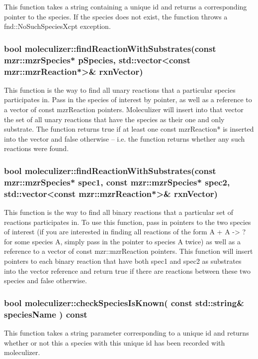 This function takes a string containing a unique id and returns a
corresponding pointer to the species.  If the species does not exist,
the function throws a fnd::NoSuchSpeciesXcpt exception.  

\subsubsection{bool
  moleculizer::findReactionWithSubstrates(const mzr::mzrSpecies*
  pSpecies, std::vector<const mzr::mzrReaction*>\& rxnVector) }

This function is the way to find all unary reactions that a particular
species participates in.  Pass in the species of interest by pointer,
as well as a reference to a vector of const mzrReaction pointers.
Moleculizer will insert into that vector the set of all unary
reactions that have the species as their one and only substrate.  The
function returns true if at least one const mzrReaction* is inserted
into the vector and false otherwise -- i.e. the function returns
whether any such reactions were found.  


\subsubsection{bool moleculizer::findReactionWithSubstrates(const
  mzr::mzrSpecies* spec1, const mzr::mzrSpecies* spec2,
  std::vector<const mzr::mzrReaction*>\& rxnVector)}

This function is the way to find all binary reactions that a
particular set of reactions participates in.  To use this function,
pass in pointers to the two species of interest (if you are interested
in finding all reactions of the form A + A -> ? for some species A,
simply pass in the pointer to species A twice) as well as a reference
to a vector of const mzr::mzrReaction pointers.  This function will
insert pointers to each binary reaction that have both spec1 and spec2
as substrates into the vector reference and return true if there are
reactions between these two species and false otherwise.  

\subsubsection{ bool moleculizer::checkSpeciesIsKnown( const
  std::string\& speciesName ) const}
This function takes a string parameter corresponding to a unique id
and returns whether or not this a species with this unique id has been
recorded with moleculizer.


